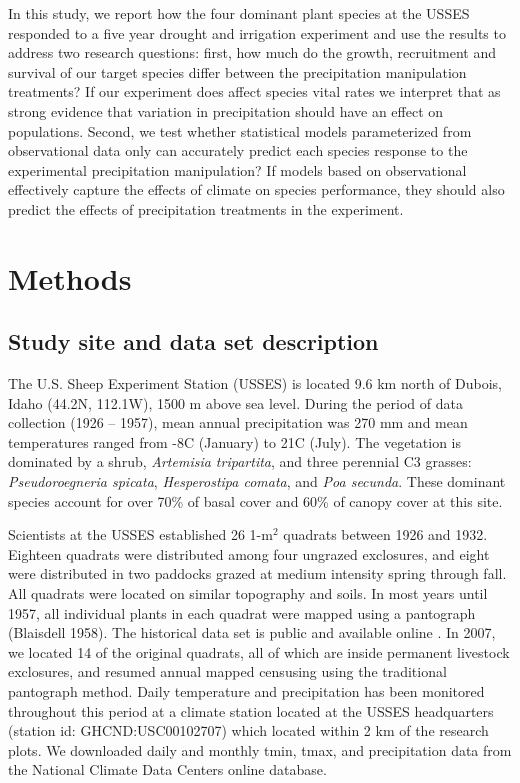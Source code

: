 \documentclass[11pt]{article}
\begin{document}
\begin{doublespacing}
In this study, we report how the four dominant plant species at the USSES responded to a five year drought and irrigation experiment and use the results to address two research questions: first, how much do the growth, recruitment and survival of our target species differ between the precipitation manipulation treatments? If our experiment does affect species vital rates we interpret that as strong evidence that variation in precipitation should have an effect on populations. Second, we test whether statistical models parameterized from observational data only can accurately predict each species response to the experimental precipitation manipulation? If models based on observational effectively capture the effects of climate on species performance, they should also predict the effects of precipitation treatments in the experiment. 

\section*{Methods}

\subsection*{Study site and data set description}

The U.S. Sheep Experiment Station (USSES) is located 9.6 km north of Dubois, Idaho (44.2\degree N, 112.1\degree W), 1500 m above sea level. During the period of data collection (1926 – 1957), mean annual precipitation was 270 mm and mean temperatures ranged from -8\degree C (January) to 21\degree C (July). The vegetation is dominated by a shrub, \textit{Artemisia tripartita}, and three perennial C3 grasses: \textit{Pseudoroegneria spicata}, \textit{Hesperostipa comata}, and \textit{Poa secunda}. These dominant species account for over 70\% of basal cover and 60\% of canopy cover at this site. 

Scientists at the USSES established 26 1-m$^2$ quadrats between 1926 and 1932. Eighteen quadrats were distributed among four ungrazed exclosures, and eight were distributed in two paddocks grazed at medium intensity spring through fall. All quadrats were located on similar topography and soils. In most years until 1957, all individual plants in each quadrat were mapped using a pantograph (Blaisdell 1958). The historical data set is public and available online \citep{zachmann_mapped_2010}. In 2007, we located 14 of the original quadrats, all of which are inside permanent livestock exclosures, and resumed annual mapped censusing using the traditional pantograph method. Daily temperature and precipitation has been monitored throughout this period at a climate station located at the USSES headquarters (station id: GHCND:USC00102707) which located within 2 km of the research plots.  We downloaded daily and monthly tmin, tmax, and precipitation data from the National Climate Data Centers online database.  


\end{doublespacing}
\end{document}
